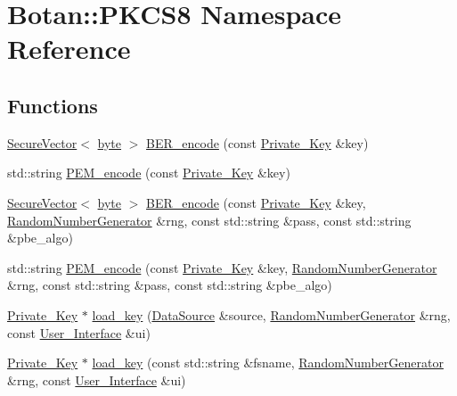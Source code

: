\hypertarget{namespaceBotan_1_1PKCS8}{\section{Botan\-:\-:P\-K\-C\-S8 Namespace Reference}
\label{namespaceBotan_1_1PKCS8}
}
\subsection*{Functions}
\begin{DoxyCompactItemize}
\item 
\hyperlink{classBotan_1_1SecureVector}{Secure\-Vector}$<$ \hyperlink{namespaceBotan_a7d793989d801281df48c6b19616b8b84}{byte} $>$ \hyperlink{namespaceBotan_1_1PKCS8_a4796335c320788355dbb532972aa296a}{B\-E\-R\-\_\-encode} (const \hyperlink{classBotan_1_1Private__Key}{Private\-\_\-\-Key} \&key)
\item 
std\-::string \hyperlink{namespaceBotan_1_1PKCS8_abd54a7212d021f33fea536f11ef1ca98}{P\-E\-M\-\_\-encode} (const \hyperlink{classBotan_1_1Private__Key}{Private\-\_\-\-Key} \&key)
\item 
\hyperlink{classBotan_1_1SecureVector}{Secure\-Vector}$<$ \hyperlink{namespaceBotan_a7d793989d801281df48c6b19616b8b84}{byte} $>$ \hyperlink{namespaceBotan_1_1PKCS8_ac2070bd916fb8f65318e191a34f3a59c}{B\-E\-R\-\_\-encode} (const \hyperlink{classBotan_1_1Private__Key}{Private\-\_\-\-Key} \&key, \hyperlink{classBotan_1_1RandomNumberGenerator}{Random\-Number\-Generator} \&rng, const std\-::string \&pass, const std\-::string \&pbe\-\_\-algo)
\item 
std\-::string \hyperlink{namespaceBotan_1_1PKCS8_a189b80a771b1dee046de73aecce0d48e}{P\-E\-M\-\_\-encode} (const \hyperlink{classBotan_1_1Private__Key}{Private\-\_\-\-Key} \&key, \hyperlink{classBotan_1_1RandomNumberGenerator}{Random\-Number\-Generator} \&rng, const std\-::string \&pass, const std\-::string \&pbe\-\_\-algo)
\item 
\hyperlink{classBotan_1_1Private__Key}{Private\-\_\-\-Key} $\ast$ \hyperlink{namespaceBotan_1_1PKCS8_ab3853ea8ff150236505233cf5fdd1671}{load\-\_\-key} (\hyperlink{classBotan_1_1DataSource}{Data\-Source} \&source, \hyperlink{classBotan_1_1RandomNumberGenerator}{Random\-Number\-Generator} \&rng, const \hyperlink{classBotan_1_1User__Interface}{User\-\_\-\-Interface} \&ui)
\item 
\hyperlink{classBotan_1_1Private__Key}{Private\-\_\-\-Key} $\ast$ \hyperlink{namespaceBotan_1_1PKCS8_a62f0f414d2312ec05c93681b39d4fa03}{load\-\_\-key} (const std\-::string \&fsname, \hyperlink{classBotan_1_1RandomNumberGenerator}{Random\-Number\-Generator} \&rng, const \hyperlink{classBotan_1_1User__Interface}{User\-\_\-\-Interface} \&ui)

\end{DoxyCompactItemize}
